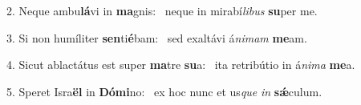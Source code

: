 2. Neque ambu\textbf{lá}vi in \textbf{ma}gnis: \ast\  neque in mirabí\textit{li}\textit{bus} \textbf{su}per me.\

3. Si non humíliter \textbf{sen}ti\textbf{é}bam: \ast\  sed exaltávi á\textit{ni}\textit{mam} \textbf{me}am.\

4. Sicut ablactátus est super \textbf{ma}tre \textbf{su}a: \ast\  ita retribútio in á\textit{ni}\textit{ma} \textbf{me}a.\

5. Speret Isra\textbf{ël} in \textbf{Dó}\textbf{mi}no: \ast\  ex hoc nunc et us\textit{que} \textit{in} \textbf{sǽ}culum.\

